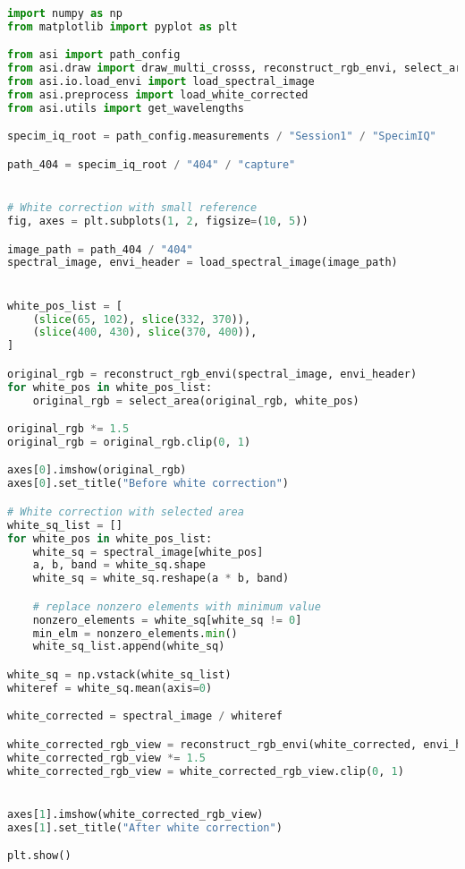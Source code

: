 \begin{lstlisting}[language=python, caption=White correction for SpecimIQ with small reference, label={code:wc-specimiq-small}]
import numpy as np
from matplotlib import pyplot as plt

from asi import path_config
from asi.draw import draw_multi_crosss, reconstruct_rgb_envi, select_area
from asi.io.load_envi import load_spectral_image
from asi.preprocess import load_white_corrected
from asi.utils import get_wavelengths

specim_iq_root = path_config.measurements / "Session1" / "SpecimIQ"

path_404 = specim_iq_root / "404" / "capture"


# White correction with small reference
fig, axes = plt.subplots(1, 2, figsize=(10, 5))

image_path = path_404 / "404"
spectral_image, envi_header = load_spectral_image(image_path)


white_pos_list = [
    (slice(65, 102), slice(332, 370)),
    (slice(400, 430), slice(370, 400)),
]

original_rgb = reconstruct_rgb_envi(spectral_image, envi_header)
for white_pos in white_pos_list:
    original_rgb = select_area(original_rgb, white_pos)

original_rgb *= 1.5
original_rgb = original_rgb.clip(0, 1)

axes[0].imshow(original_rgb)
axes[0].set_title("Before white correction")

# White correction with selected area
white_sq_list = []
for white_pos in white_pos_list:
    white_sq = spectral_image[white_pos]
    a, b, band = white_sq.shape
    white_sq = white_sq.reshape(a * b, band)

    # replace nonzero elements with minimum value
    nonzero_elements = white_sq[white_sq != 0]
    min_elm = nonzero_elements.min()
    white_sq_list.append(white_sq)

white_sq = np.vstack(white_sq_list)
whiteref = white_sq.mean(axis=0)

white_corrected = spectral_image / whiteref

white_corrected_rgb_view = reconstruct_rgb_envi(white_corrected, envi_header)
white_corrected_rgb_view *= 1.5
white_corrected_rgb_view = white_corrected_rgb_view.clip(0, 1)


axes[1].imshow(white_corrected_rgb_view)
axes[1].set_title("After white correction")

plt.show()


\end{lstlisting}
